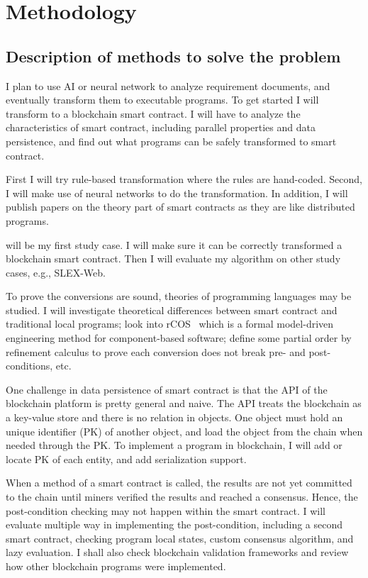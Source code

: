 \chapter{Methodology}


\section{Description of methods to solve the problem}

I plan to use AI or neural network to analyze requirement documents, and eventually transform them to executable programs.
To get started I will transform to a blockchain smart contract.
I will have to analyze the characteristics of smart contract, including parallel properties and data persistence, and find out what programs can be safely transformed to smart contract.

First I will try rule-based transformation where the rules are hand-coded. Second, I will make use of neural networks to do the transformation. In addition, I will publish papers on the theory part of smart contracts as they are like distributed programs.

{\cocome} will be my first study case. I will make sure it can be correctly transformed a blockchain smart contract. Then I will evaluate my algorithm on other study cases, e.g., SLEX-Web.

To prove the conversions are sound, theories of programming languages may be studied. I will investigate theoretical differences between smart contract and traditional local programs;
look into rCOS~\cite{ke2012rcos} which is a formal model-driven engineering method for component-based software;
define some partial order by refinement calculus to prove each conversion does not break pre- and post-conditions, etc.

One challenge in data persistence of smart contract is that the API of the blockchain platform is pretty general and naive. The API treats the blockchain as a key-value store and there is no relation in objects. One object must hold an unique identifier (PK) of another object, and load the object from the chain when needed through the PK.
To implement a program in blockchain, I will add or locate PK of each entity, and add serialization support.

When a method of a smart contract is called, the results are not yet committed to the chain until miners verified the results and reached a consensus. Hence, the post-condition checking may not happen within the smart contract. I will evaluate multiple way in implementing the post-condition, including a second smart contract, checking program local states, custom consensus algorithm, and lazy evaluation.
I shall also check blockchain validation frameworks and review how other blockchain programs were implemented.

